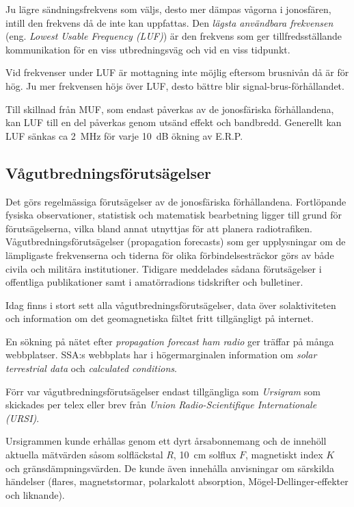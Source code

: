 Ju lägre sändningsfrekvens som väljs, desto mer dämpas vågorna i
jonosfären, intill den frekvens då de inte kan uppfattas.
Den \emph{lägsta användbara frekvensen}
(eng. \emph{Lowest Usable Frequency (LUF)}) är den
frekvens som ger tillfredsställande kommunikation för en viss
utbredningsväg och vid en viss tidpunkt.

Vid frekvenser under LUF är mottagning inte möjlig eftersom brusnivån
då är för hög.
Ju mer frekvensen höjs över LUF, desto bättre blir signal-brus-förhållandet.

Till skillnad från MUF, som endast påverkas av de jonosfäriska
förhållandena, kan LUF till en del påverkas genom utsänd effekt och bandbredd.
Generellt kan LUF sänkas ca 2~MHz för varje 10~dB ökning av E.R.P.

\subsection{Vågutbredningsförutsägelser}

Det görs regelmässiga förutsägelser av de jonosfäriska förhållandena.
Fortlöpande fysiska observationer, statistisk och matematisk bearbetning ligger
till grund för förutsägelserna, vilka bland annat utnyttjas för att planera
radiotrafiken.
Vågutbredningsförutsägelser (propagation forecasts) som ger upplysningar om de
lämpligaste frekvenserna och tiderna för olika förbindelsesträckor görs av både
civila och militära institutioner.
Tidigare meddelades sådana förutsägelser i offentliga publikationer samt i 
amatörradions tidskrifter och bulletiner.

Idag finns i stort sett alla vågutbredningsförutsägelser, data över
solaktiviteten och information om det geomagnetiska fältet fritt tillgängligt på
internet.

En sökning på nätet efter \emph{propagation forecast ham radio} ger träffar på
många webbplatser.
SSA:s webbplats har i högermarginalen information om \emph{solar terrestrial data}
och \emph{calculated conditions}.

Förr var vågutbredningsförutsägelser endast tillgängliga som \emph{Ursigram} som
skickades per telex eller brev från \emph{Union Radio-Scientifique
Internationale (URSI)}.

Ursigrammen kunde erhållas genom ett dyrt årsabonnemang och de innehöll aktuella
mätvärden såsom solfläckstal \(R\), 10~cm solflux \(F\), magnetiskt index \(K\)
och gränsdämpningsvärden.
De kunde även innehålla anvisningar om särskilda händelser (flares,
magnetstormar, polarkalott absorption, Mögel-Dellinger-effekter och liknande).

